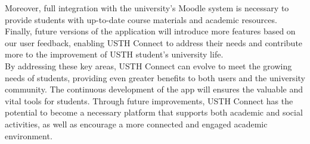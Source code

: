 \documentclass[12pt]{article}
\begin{document}
Moreover, full integration with the university's Moodle system is necessary to provide students with up-to-date course materials and academic resources. 
Finally, future versions of the application will introduce more features based on our user feedback, enabling USTH Connect to address their needs and contribute more to the improvement of USTH student's university life. \\

By addressing these key areas, USTH Connect can evolve to meet the growing needs of students, providing even greater benefits to both users and the university community. The continuous development of the app will ensures the valuable and vital tools for students.
Through future improvements, USTH Connect has the potential to become a necessary platform that supports both academic and social activities, as well as encourage a more connected and engaged academic environment.
\end{document}
